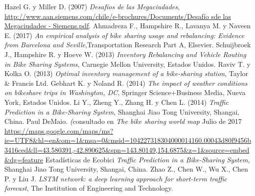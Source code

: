 \documentclass[12pt,spanish]{article}
\begin{document}
	
	\newpage	
	\begin{thebibliography}{9}
		
		Hazel G. y Miller D. (2007)
		\textit{Desafíos de las Megaciudades},
		\underline{http://www.aan.siemens.com/chile/e-brochures/Documents/Desafío sde las Megaciudades - Siemens.pdf}.
		Ahmadreza F., Hampshire R., Lavanya M. y Naveen E. (2017) \textit{An empirical analysis of bike sharing usage and rebalancing: Evidence from Barcelona and Seville},Transportation Research Part A, Elsevier.
		Schuijbroek J., Hampshire R. y Hoeve W. (2013) \textit{Inventory Rebalancing and Vehicle Routing in Bike	Sharing Systems}, Carnegie Mellon University, Estados Unidos.
		Raviv T. y Kolka O. (2013) \textit{Optimal inventory management of a bike-sharing station}, Taylor \& Francis Ltd.
		Gebhart K. y Noland R. (2014) \textit{The impact of weather conditions on bikeshare trips in Washington, DC}, Springer Science+Business Media, Nueva York, Estados Unidos.
		Li Y., Zheng Y., Zhang H. y Chen L. (2014) \textit{Traffic Prediction in a Bike-Sharing System}, Shanghai Jiao Tong University, Shangai, China.
		Paul DeMaio. \textit(consultado en \textit{The bike sharing world map} Julio de 2017 \underline{https://maps.google.com/maps/ms?ie=UTF8\&hl=en\&om=1\&msa=0\&msid=104227318304000014160.00043d80f9456b3416ced\&ll=43.580391,-42.890625\&spn=143.80149,154.6875\&z=1\&source=embed\&dg=feature}
		Estadísticas de Ecobici \textit{Traffic Prediction in a Bike-Sharing System}, Shanghai Jiao Tong University, Shangai, China.
		Zhao Z., Chen W., Wu X., Chen P. y Liu J. \textit{LSTM network: a deep learning approach for short-term traffic forecast}, The Institution of Engineering and Technology.

	
	\end{thebibliography}
\end{document}
